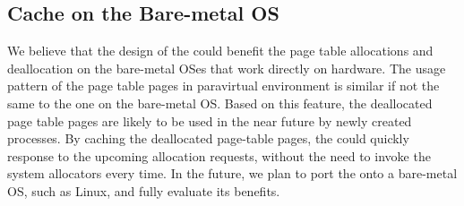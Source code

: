 
\subsection{\name Cache on the Bare-metal OS}
We believe that the design of the \cache could benefit the page table allocations and deallocation on the bare-metal OSes that work directly on hardware.
The usage pattern of the page table pages in paravirtual environment is similar if not the same to the one on the bare-metal OS.
Based on this feature, the deallocated page table pages are likely to be used in the near future by newly created processes.
By caching the deallocated page-table pages, the \cache could quickly response to the upcoming allocation requests, without the need to invoke the system allocators every time.
In the future, we plan to port the \cache onto a bare-metal OS, such as Linux, and fully evaluate its benefits.
